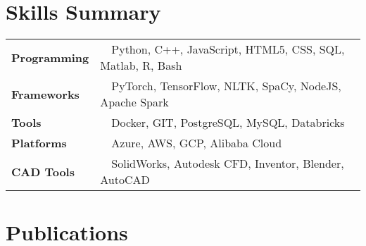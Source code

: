 \documentclass[a4paper,20pt]{article}
\newcommand{\resumeSubHeadingListStart}{}
\begin{document}
\vspace{-1pt}
\section{Skills Summary}
\begin{tabular}{@{}ll}
\textbf{Programming} & ~~Python, C++, JavaScript, HTML5, CSS, SQL, Matlab, R, Bash    \\
\textbf{Frameworks}  & ~~PyTorch, TensorFlow, NLTK, SpaCy, NodeJS, Apache Spark       \\
\textbf{Tools}       & ~~Docker, GIT, PostgreSQL, MySQL, Databricks                   \\
\textbf{Platforms}   & ~~Azure, AWS, GCP, Alibaba Cloud                               \\
\textbf{CAD Tools}   & ~~SolidWorks, Autodesk CFD, Inventor, Blender, AutoCAD         \\
\end{tabular}



\vspace{1pt}
\section{Publications}
\resumeSubHeadingListStart
\end{document}
